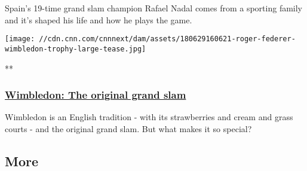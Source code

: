 Spain's 19-time grand slam champion Rafael Nadal comes from a sporting
family and it's shaped his life and how he plays the game.

\href{/videos/sports/2019/07/02/wimbledon-original-grand-slam-english-tradition-tennis-spt-intl-lon-orig-gbr.cnn}{}

\texttt{[image: //cdn.cnn.com/cnnnext/dam/assets/180629160621-roger-federer-wimbledon-trophy-large-tease.jpg]}

**

\hypertarget{wimbledon-the-original-grand-slam}{%
\subsubsection{\texorpdfstring{\href{/videos/sports/2019/07/02/wimbledon-original-grand-slam-english-tradition-tennis-spt-intl-lon-orig-gbr.cnn}{Wimbledon:
The original grand
slam}}{Wimbledon: The original grand slam}}\label{wimbledon-the-original-grand-slam}}

Wimbledon is an English tradition - with its strawberries and cream and
grass courts - and the original grand slam. But what makes it so
special?

\hypertarget{more-}{%
\subsection{More~}\label{more-}}

